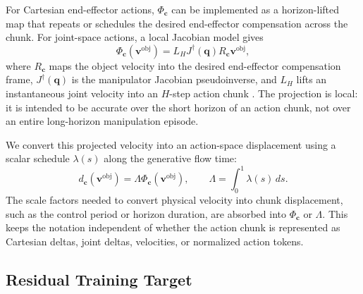 \documentclass[10pt,twocolumn,letterpaper]{article}
\begin{document}
For Cartesian end-effector actions, $\Phi_{\mathbf c}$ can be implemented as a
horizon-lifted map that repeats or schedules the desired end-effector
compensation across the chunk. For joint-space actions, a local Jacobian model
gives
\begin{equation}
    \Phi_{\mathbf c}(\mathbf v^{\mathrm{obj}})
    =
    L_H J^\dagger(\mathbf q) R_{\mathbf c}\mathbf v^{\mathrm{obj}},
    \label{eq:kinematic_projection}
\end{equation}
where $R_{\mathbf c}$ maps the object velocity into the desired end-effector
compensation frame, $J^\dagger(\mathbf q)$ is the manipulator Jacobian
pseudoinverse, and $L_H$ lifts an instantaneous joint velocity into an
$H$-step action chunk \citep{nakamura1991advanced,siciliano2009robotics}. The
projection is local: it is intended to be accurate over the short horizon of an
action chunk, not over an entire long-horizon manipulation episode.

We convert this projected velocity into an action-space displacement using a
scalar schedule $\lambda(s)$ along the generative flow time:
\begin{equation}
    d_{\mathbf c}(\mathbf v^{\mathrm{obj}})
    =
    \Lambda \Phi_{\mathbf c}(\mathbf v^{\mathrm{obj}}),
    \qquad
    \Lambda=\int_0^1 \lambda(s)\,ds .
    \label{eq:integrated_velocity_displacement}
\end{equation}
The scale factors needed to convert physical velocity into chunk displacement,
such as the control period or horizon duration, are absorbed into
$\Phi_{\mathbf c}$ or $\Lambda$. This keeps the notation independent of whether
the action chunk is represented as Cartesian deltas, joint deltas, velocities,
or normalized action tokens.

\subsection{Residual Training Target}
\label{subsec:residual_target}
\end{document}
